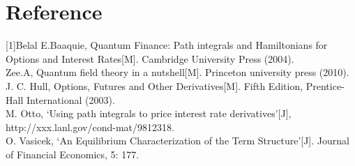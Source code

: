\documentclass[12pt,a4paper]{paper}
\begin{document}
\section{Reference}
{[1]}Belal E.Baaquie, Quantum Finance: Path integrals and Hamiltonians for Options and Interest Rates[M]. Cambridge University Press (2004).\\
\indent{[2]}Zee.A, Quantum field theory in a nutshell[M]. Princeton university press (2010).\\
\indent{[3]}J. C. Hull, Options, Futures and Other Derivatives[M]. Fifth Edition, Prentice-Hall International (2003).\\
\indent{[4]}M. Otto, ‘Using path integrals to price interest rate derivatives’[J], http://xxx.lanl.gov/cond-mat/9812318.\\
\indent{[5]}O. Vasicek, ‘An Equilibrium Characterization of the Term Structure’[J]. Journal of Financial Economics, 5: 177.\\
\end{document}
